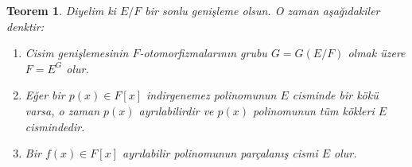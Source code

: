 \documentclass[draft]{article}
\newtheorem{thm}{Teorem}[section]
\theoremstyle{definition}
\theoremstyle{remark}
\begin{document}
    		\begin{thm}
    		    Diyelim ki $E/F$ bir sonlu genişleme olsun. O zaman aşağıdakiler denktir:
    		    \begin{enumerate}
    				\renewcommand{\labelenumi}{(\roman{enumi})}
    				\item Cisim genişlemesinin $F$-otomorfizmalarının grubu $G = G(E/F)$ olmak üzere $F = E^G$ olur.
    				\item Eğer bir $p(x) \in F[x]$ indirgenemez polinomunun $E$ cisminde bir kökü varsa, o zaman $p(x)$ ayrılabilirdir ve $p(x)$ polinomunun tüm kökleri $E$ cismindedir.
    				\item Bir $f(x) \in F[x]$ ayrılabilir polinomunun parçalanış cismi $E$ olur.
    			\end{enumerate}
    		\end{thm}
    		
\end{document}
